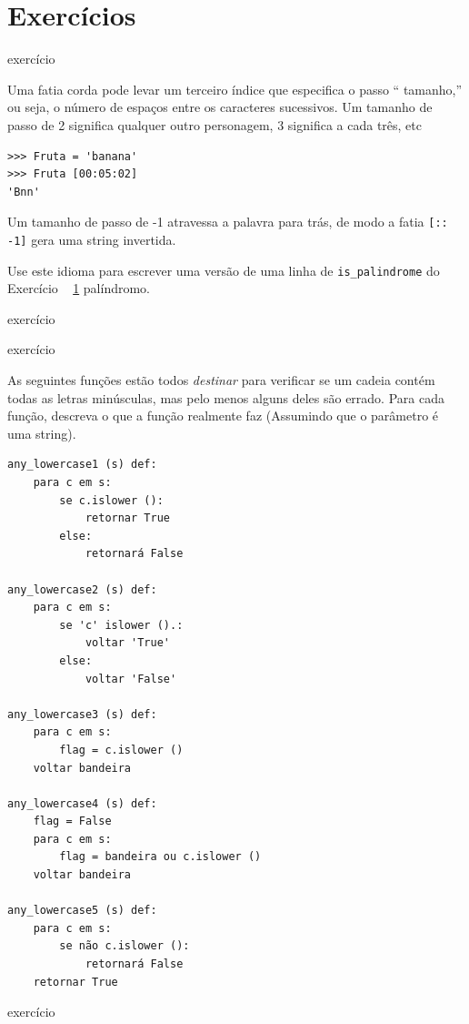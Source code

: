 \documentclass[10pt]{book}
\begin{document}
\section{Exercícios}

\begin{} exercício

Uma fatia corda pode levar um terceiro índice que especifica o passo ``
tamanho,'' ou seja, o número de espaços entre os caracteres sucessivos.
Um tamanho de passo de 2 significa qualquer outro personagem, 3 significa a cada três,
etc

\begin{verbatim}
>>> Fruta = 'banana'
>>> Fruta [00:05:02]
'Bnn'
\end{verbatim}

Um tamanho de passo de -1 atravessa a palavra para trás, de modo
a fatia \verb "[:: -1]" gera uma string invertida.

Use este idioma para escrever uma versão de uma linha de \verb "is_palindrome"
do Exercício ~ \ref {} palíndromo.
\end{} exercício


\begin{} exercício

As seguintes funções estão todos {\em destinar} para verificar se um
cadeia contém todas as letras minúsculas, mas pelo menos alguns deles são
errado. Para cada função, descreva o que a função realmente faz
(Assumindo que o parâmetro é uma string).

\begin{verbatim}
any_lowercase1 (s) def:
    para c em s:
        se c.islower ():
            retornar True
        else:
            retornará False

any_lowercase2 (s) def:
    para c em s:
        se 'c' islower ().:
            voltar 'True'
        else:
            voltar 'False'

any_lowercase3 (s) def:
    para c em s:
        flag = c.islower ()
    voltar bandeira

any_lowercase4 (s) def:
    flag = False
    para c em s:
        flag = bandeira ou c.islower ()
    voltar bandeira

any_lowercase5 (s) def:
    para c em s:
        se não c.islower ():
            retornará False
    retornar True
\end{verbatim}

\end{} exercício
\end{document}
